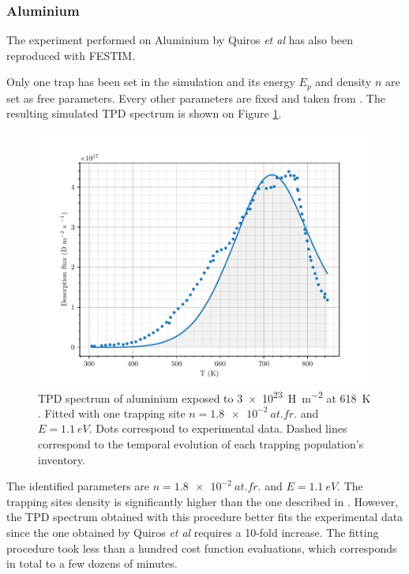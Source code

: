 \subsubsection{Aluminium}

The experiment performed on Aluminium by Quiros \textit{et al}  has also been reproduced with FESTIM.

Only one trap has been set in the simulation and its energy $E_p$ and density $n$ are set as free parameters.
Every other parameters are fixed and taken from .
The resulting simulated TPD spectrum is shown on Figure \ref{fig:TPD alu}.
\begin{figure} [ht]
    \centering
    \includegraphics[width=\linewidth]{Figures/Chapter3/Parametric_optimisation/alu_quiros.pdf}
    \caption{TPD spectrum of aluminium exposed to \SI{3e23}{H.m^{-2}} at \SI{618}{K} \cite{quiros_blister_2017, quiros_blistering_2019}. Fitted with one trapping site $n = \SI{1.8e-2}{at.fr.}$ and $E =\SI{1.1}{eV}$. Dots correspond to experimental data. Dashed lines correspond to the temporal evolution of each trapping population's inventory.}
    \label{fig:TPD alu}
\end{figure}


The identified parameters are $n = \SI{1.8e-2}{at.fr.}$ and $E =\SI{1.1}{eV}$.
The trapping sites density is significantly higher than the one described in .
However, the TPD spectrum obtained with this procedure better fits the experimental data since the one obtained by Quiros \textit{et al} requires a 10-fold increase.
The fitting procedure took less than a hundred cost function evaluations, which corresponds in total to a few dozens of minutes.

